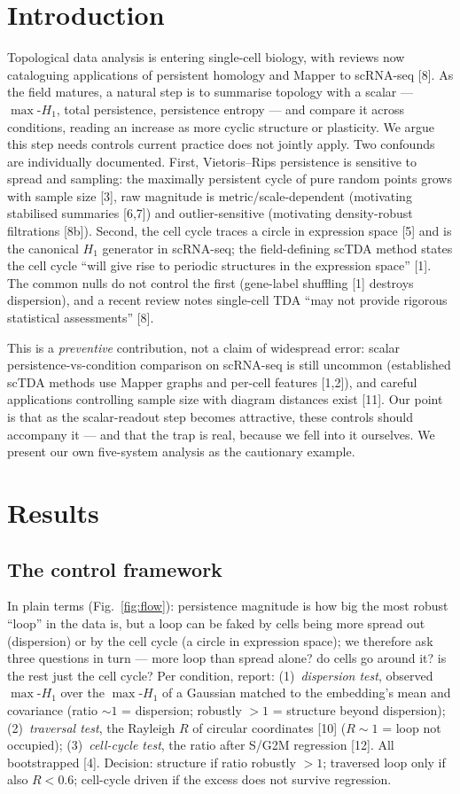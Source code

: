 \documentclass[11pt,a4paper]{article}
\newcommand{\maxh}{\ensuremath{\max\text{-}H_1}}
\begin{document}
\section{Introduction}
Topological data analysis is entering single-cell biology, with reviews now cataloguing
applications of persistent homology and Mapper to scRNA-seq [8]. As the field matures, a natural
step is to summarise topology with a scalar --- \maxh, total persistence, persistence entropy ---
and compare it across conditions, reading an increase as more cyclic structure or plasticity. We
argue this step needs controls current practice does not jointly apply. Two confounds are
individually documented. First, Vietoris--Rips persistence is sensitive to spread and sampling: the
maximally persistent cycle of pure random points grows with sample size [3], raw magnitude is
metric/scale-dependent (motivating stabilised summaries [6,7]) and outlier-sensitive (motivating
density-robust filtrations [8b]). Second, the cell cycle traces a circle in expression space [5]
and is the canonical $H_1$ generator in scRNA-seq; the field-defining scTDA method states the cell
cycle ``will give rise to periodic structures in the expression space'' [1]. The common nulls do
not control the first (gene-label shuffling [1] destroys dispersion), and a recent review notes
single-cell TDA ``may not provide rigorous statistical assessments'' [8].

This is a \emph{preventive} contribution, not a claim of widespread error: scalar
persistence-vs-condition comparison on scRNA-seq is still uncommon (established scTDA methods use
Mapper graphs and per-cell features [1,2]), and careful applications controlling sample size with
diagram distances exist [11]. Our point is that as the scalar-readout step becomes attractive,
these controls should accompany it --- and that the trap is real, because we fell into it
ourselves. We present our own five-system analysis as the cautionary example.

\section{Results}
\subsection*{The control framework}
In plain terms (Fig.~\ref{fig:flow}): persistence magnitude is how big the most robust ``loop'' in
the data is, but a loop can be faked by cells being more spread out (dispersion) or by the cell cycle
(a circle in expression space); we therefore ask three questions in turn --- more loop than spread
alone? do cells go around it? is the rest just the cell cycle? Per condition, report:
(1)~\emph{dispersion test}, observed \maxh{} over the \maxh{} of a Gaussian
matched to the embedding's mean and covariance (ratio $\sim1$ = dispersion; robustly $>1$ =
structure beyond dispersion); (2)~\emph{traversal test}, the Rayleigh $R$ of circular coordinates
[10] ($R\sim1$ = loop not occupied); (3)~\emph{cell-cycle test}, the ratio after S/G2M regression
[12]. All bootstrapped [4]. Decision: structure if ratio robustly $>1$; traversed loop only if also
$R<0.6$; cell-cycle driven if the excess does not survive regression.
\end{document}
